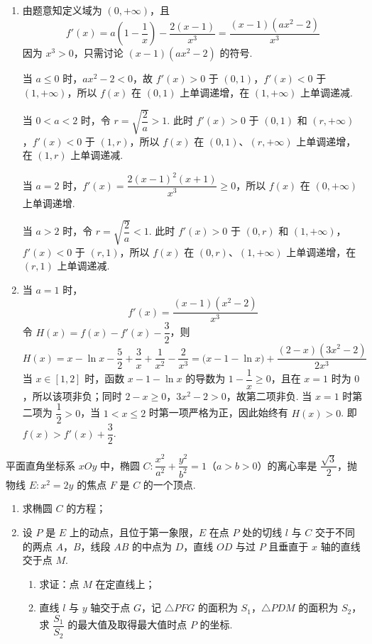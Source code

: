\begin{solution}
\begin{enumerate}
\item 由题意知定义域为 \((0,+\infty)\)，且
\[
f'(x)=a\left(1-\frac1x\right)-\frac{2(x-1)}{x^3}=\frac{(x-1)(ax^2-2)}{x^3}
\]
因为 \(x^3>0\)，只需讨论 \((x-1)(ax^2-2)\) 的符号.

当 \(a\leq0\) 时，\(ax^2-2<0\)，故 \(f'(x)>0\) 于 \((0,1)\)，\(f'(x)<0\) 于 \((1,+\infty)\)，所以 \(f(x)\) 在 \((0,1)\) 上单调递增，在 \((1,+\infty)\) 上单调递减.

当 \(0<a<2\) 时，令 \(r=\sqrt{\dfrac2a}>1\). 此时 \(f'(x)>0\) 于 \((0,1)\) 和 \((r,+\infty)\)，\(f'(x)<0\) 于 \((1,r)\)，所以 \(f(x)\) 在 \((0,1)\)、\((r,+\infty)\) 上单调递增，在 \((1,r)\) 上单调递减.

当 \(a=2\) 时，\(f'(x)=\dfrac{2(x-1)^2(x+1)}{x^3}\geq0\)，所以 \(f(x)\) 在 \((0,+\infty)\) 上单调递增.

当 \(a>2\) 时，令 \(r=\sqrt{\dfrac2a}<1\). 此时 \(f'(x)>0\) 于 \((0,r)\) 和 \((1,+\infty)\)，\(f'(x)<0\) 于 \((r,1)\)，所以 \(f(x)\) 在 \((0,r)\)、\((1,+\infty)\) 上单调递增，在 \((r,1)\) 上单调递减.
\item 当 \(a=1\) 时，
\[
f'(x)=\frac{(x-1)(x^2-2)}{x^3}
\]
令 \(H(x)=f(x)-f'(x)-\dfrac32\)，则
\[
H(x)=x-\ln x-\frac52+\frac3x+\frac1{x^2}-\frac2{x^3}
 =\bigl(x-1-\ln x\bigr)+\frac{(2-x)(3x^2-2)}{2x^3}
\]
当 \(x\in[1,2]\) 时，函数 \(x-1-\ln x\) 的导数为 \(1-\dfrac1x\geq0\)，且在 \(x=1\) 时为 \(0\)，所以该项非负；同时 \(2-x\geq0\)，\(3x^2-2>0\)，故第二项非负. 当 \(x=1\) 时第二项为 \(\dfrac12>0\)，当 \(1<x\leq2\) 时第一项严格为正，因此始终有 \(H(x)>0\). 即 \(f(x)>f'(x)+\dfrac32\).
\end{enumerate}
\end{solution}

\begin{problem}
平面直角坐标系 \(xOy\) 中，椭圆 \(C\colon\dfrac{x^2}{a^2}+\dfrac{y^2}{b^2}=1\)（\(a>b>0\)）的离心率是 \(\dfrac{\sqrt3}{2}\)，抛物线 \(E\colon x^2=2y\) 的焦点 \(F\) 是 \(C\) 的一个顶点.
\begin{enumerate}
\item 求椭圆 \(C\) 的方程；
\item 设 \(P\) 是 \(E\) 上的动点，且位于第一象限，\(E\) 在点 \(P\) 处的切线 \(l\) 与 \(C\) 交于不同的两点 \(A\)，\(B\)，线段 \(AB\) 的中点为 \(D\)，直线 \(OD\) 与过 \(P\) 且垂直于 \(x\) 轴的直线交于点 \(M\).
\begin{enumerate}
\item 求证：点 \(M\) 在定直线上；
\item 直线 \(l\) 与 \(y\) 轴交于点 \(G\)，记 \(\triangle PFG\) 的面积为 \(S_1\)，\(\triangle PDM\) 的面积为 \(S_2\)，求 \(\dfrac{S_1}{S_2}\) 的最大值及取得最大值时点 \(P\) 的坐标.
\end{enumerate}
\end{enumerate}

\end{problem}

